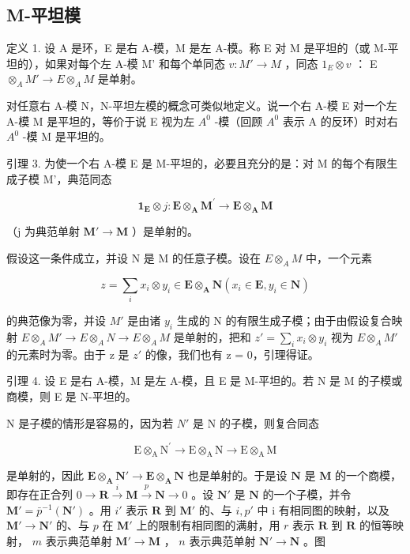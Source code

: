 \subsection{M-平坦模}

定义 1. 设 A 是环，E 是右 A-模，M 是左 A-模。称 E 对 M 是平坦的（或 M-平坦的），如果对每个左 A-模 M' 和每个单同态 \(v: M' \to M\) ，同态 \(1_{E} \otimes v\) ： E \(\otimes_{A} M' \to E \otimes_{A} M\) 是单射。

对任意右 A-模 N，N-平坦左模的概念可类似地定义。说一个右 A-模 E 对一个左 A-模 M 是平坦的，等价于说 E 视为左 \(A^{0}\) -模（回顾 \(A^{0}\) 表示 A 的反环）时对右 \(A^{0}\) -模 M 是平坦的。

引理 3. 为使一个右 A-模 E 是 M-平坦的，必要且充分的是：对 M 的每个有限生成子模 M'，典范同态

\[
\mathbf {1} _ {\mathbf {E}} \otimes j: \mathbf {E} \otimes_ {\mathbf {A}} \mathbf {M} ^ {\prime} \rightarrow \mathbf {E} \otimes_ {\mathbf {A}} \mathbf {M}
\]

（j 为典范单射 \(\mathbf{M}'\to \mathbf{M}\) ）是单射的。

假设这一条件成立，并设 N 是 M 的任意子模。设在 \(E \otimes_{A} M\) 中，一个元素

\[
z = \sum_ {i} x _ {i} \otimes y _ {i} \in \mathbf {E} \otimes_ {\mathbf {A}} \mathbf {N} (x _ {i} \in \mathbf {E}, y _ {i} \in \mathbf {N})
\]

的典范像为零，并设 \(M'\) 是由诸 \(y_{i}\) 生成的 N 的有限生成子模；由于由假设复合映射 \(E \otimes_{A} M' \to E \otimes_{A} N \to E \otimes_{A} M\) 是单射的，把和 \(z' = \sum_{i} x_{i} \otimes y_{i}\) 视为 \(E \otimes_{A} M'\) 的元素时为零。由于 z 是 \(z'\) 的像，我们也有 z = 0，引理得证。

引理 4. 设 E 是右 A-模，M 是左 A-模，且 E 是 M-平坦的。若 N 是 M 的子模或商模，则 E 是 N-平坦的。

N 是子模的情形是容易的，因为若 \(N'\) 是 N 的子模，则复合同态

\[
\mathrm{E} \otimes_ {\mathrm{A}} \mathrm{N} ^ {\prime} \rightarrow \mathrm{E} \otimes_ {\mathrm{A}} \mathrm{N} \rightarrow \mathrm{E} \otimes_ {\mathrm{A}} \mathrm{M}
\]

是单射的，因此 \(\mathbf{E} \otimes_{\mathbf{A}} \mathbf{N}' \to \mathbf{E} \otimes_{\mathbf{A}} \mathbf{N}\) 也是单射的。于是设 \(\mathbf{N}\) 是 \(\mathbf{M}\) 的一个商模，即存在正合列 \(0 \to \mathbf{R} \xrightarrow{i} \mathbf{M} \xrightarrow{p} \mathbf{N} \to 0\) 。设 \(\mathbf{N}'\) 是 \(\mathbf{N}\) 的一个子模，并令 \(\mathbf{M}' = \bar{p}^{-1}(\mathbf{N}')\) 。用 \(i'\) 表示 \(\mathbf{R}\) 到 \(\mathbf{M}'\) 的、与 \(i, p'\) 中 i 有相同图的映射，以及 \(\mathbf{M}' \to \mathbf{N}'\) 的、与 \(p\) 在 \(\mathbf{M}'\) 上的限制有相同图的满射，用 \(r\) 表示 \(\mathbf{R}\) 到 \(\mathbf{R}\) 的恒等映射， \(m\) 表示典范单射 \(\mathbf{M}' \to \mathbf{M}\) ， \(n\) 表示典范单射 \(\mathbf{N}' \to \mathbf{N}\) 。图

